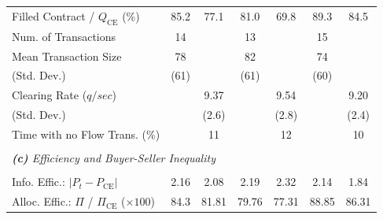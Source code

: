 \documentclass[12pt]{article}
\begin{document}
\begin{table}
\begin{threeparttable}
\begin{tabular}{lcccccc}
     Filled Contract / $Q_{\text{CE}}$ (\%)     & 85.2      & 77.1      & 81.0      & 69.8      & 89.3      & 84.5      \\
     Num. of Transactions                             & 14        &           & 13        &           & 15        &           \\
     Mean Transaction Size                      & 78        &           & 82        &           & 74        &           \\
     \hspace{3mm}(Std. Dev.)             & (61)      &           & (61)      &           & (60)      &           \\
     Clearing Rate ($q/sec$)                 &           & 9.37      &           & 9.54      &           & 9.20       \\
     \hspace{3mm}(Std. Dev.)             &           & (2.6)     &           & (2.8)     &           & (2.4)     \\
      Time with no Flow Trans. (\%)               &           & 11          &           & 12          &           & 10           \\
     \\ [-1.8ex]
     \multicolumn{7}{l}{\textit{\textbf{(c)} Efficiency and Buyer-Seller Inequality}} \\
     \\ [-1.8ex]
     Info. Effic.: $\lvert P_t - P_{\text{CE}} \rvert $        & 2.16      & 2.08      & 2.19      & 2.32      & 2.14      & 1.84      \\     
     Alloc. Effic.: $\Pi$ / $\Pi_{\text{CE}}$ ($\times 100$)          & 84.3      & 81.81     & 79.76     & 77.31     & 88.85     & 86.31     \\
     

\end{tabular}
\end{threeparttable}
\end{table}
\end{document}
